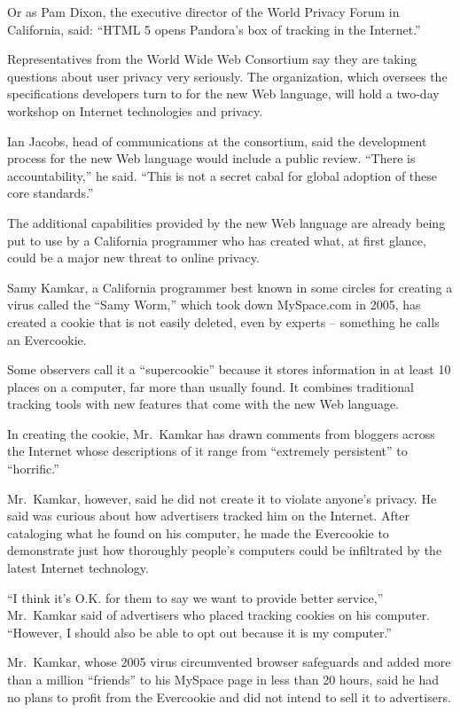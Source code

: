 ﻿\documentclass[12pt]{article}
\begin{document}
Or as Pam Dixon, the executive director of the World Privacy Forum in California, said: ``HTML 5
opens Pandora's box of tracking in the Internet.''

Representatives from the World Wide Web Consortium say they are taking questions about user privacy
very seriously. The organization, which oversees the specifications developers turn to for the new
Web language, will hold a two-day workshop on Internet technologies and privacy.

Ian Jacobs, head of communications at the consortium, said the development process for the new Web
language would include a public review. ``There is accountability,'' he said. ``This is not a secret
cabal for global adoption of these core standards.''

The additional capabilities provided by the new Web language are already being put to use by a
California programmer who has created what, at first glance, could be a major new threat to online
privacy.

Samy Kamkar, a California programmer best known in some circles for creating a virus called the
``Samy Worm,'' which took down MySpace.com in 2005, has created a cookie that is not easily deleted,
even by experts -- something he calls an Evercookie.

Some observers call it a ``supercookie'' because it stores information in at least 10 places on a
computer, far more than usually found. It combines traditional tracking tools with new features that
come with the new Web language.

In creating the cookie, Mr.~Kamkar has drawn comments from bloggers across the Internet whose
descriptions of it range from ``extremely persistent'' to ``horrific.''

Mr.~Kamkar, however, said he did not create it to violate anyone's privacy. He said was curious
about how advertisers tracked him on the Internet. After cataloging what he found on his computer,
he made the Evercookie to demonstrate just how thoroughly people's computers could be infiltrated by
the latest Internet technology.

``I think it's O.K. for them to say we want to provide better service,'' Mr.~Kamkar said of
advertisers who placed tracking cookies on his computer. ``However, I should also be able to opt out
because it is my computer.''

Mr.~Kamkar, whose 2005 virus circumvented browser safeguards and added more than a million
``friends'' to his MySpace page in less than 20 hours, said he had no plans to profit from the
Evercookie and did not intend to sell it to advertisers.
\end{document}
